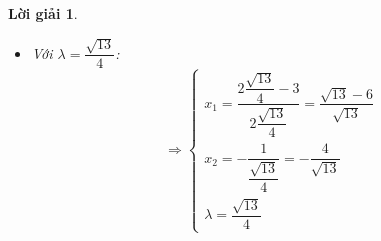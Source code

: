 \documentclass[14pt, a4paper]{article}
\theoremstyle{sltheorem}
\theoremstyle{soltheorem}
\newtheorem*{loigiai}{Lời giải}
\begin{document}
\begin{loigiai}
\begin{itemize}
            \begin{equation*}
                \begin{aligned}
                    \nabla^2 L \Big( \lambda = - \dfrac{\sqrt{13}}{4} \Big) &= \begin{pmatrix} \dfrac{\partial^2 L}{\partial x_1^2} & \dfrac{\partial^2 L}{\partial x_1 \partial x_2} \\ \dfrac{\partial^2 L}{\partial x_2 \partial x_1} & \dfrac{\partial^2 L}{\partial x_2^2} \end{pmatrix} \\
                    &= \begin{pmatrix} 2\lambda & 0 \\ 0 & 2\lambda \end{pmatrix} \\
                    &= \begin{pmatrix} -\dfrac{\sqrt{13}}{2} & 0 \\ 0 & -\dfrac{\sqrt{13}}{2} \end{pmatrix}
                \end{aligned}
            \end{equation*}

            Ta nhận thấy với $p=\begin{pmatrix} p_1 \\ p_2 \end{pmatrix}$:

            \begin{equation*}
                p^T \nabla^2 L \Big( \lambda = - \dfrac{\sqrt{13}}{4} \Big) p=- \dfrac{\sqrt{13}}{2} (p_1^2 + p_2^2) < 0 \thickspace \forall \thickspace p \in \mathbb{R}^2 \backslash \lbrace 0 \rbrace
            \end{equation*}

            Vì vậy $\nabla^2 L \Big( \lambda = - \dfrac{\sqrt{13}}{4} \Big)$ là ma trận xác định âm. Vậy các nghiệm $(x_1, x_2)$ tương ứng với $\lambda = -\dfrac{\sqrt{13}}{4}$ đã được tính ở trên là một cực đại và không phải là nghiệm của bài toán.
            \item Với $\lambda =  \dfrac{\sqrt{13}}{4}$:
            \begin{equation*}
                \Rightarrow \begin{cases} x_1 = \dfrac{2 \dfrac{\sqrt{13}}{4}-3}{2 \dfrac{\sqrt{13}}{4}}=\dfrac{\sqrt{13}-6}{\sqrt{13}} \\ x_2 = - \dfrac{1}{\dfrac{\sqrt{13}}{4}}=-\dfrac{4}{\sqrt{13}} \\ \lambda = \dfrac{\sqrt{13}}{4} \end{cases}
            \end{equation*}


\end{itemize}
\end{loigiai}
\end{document}
